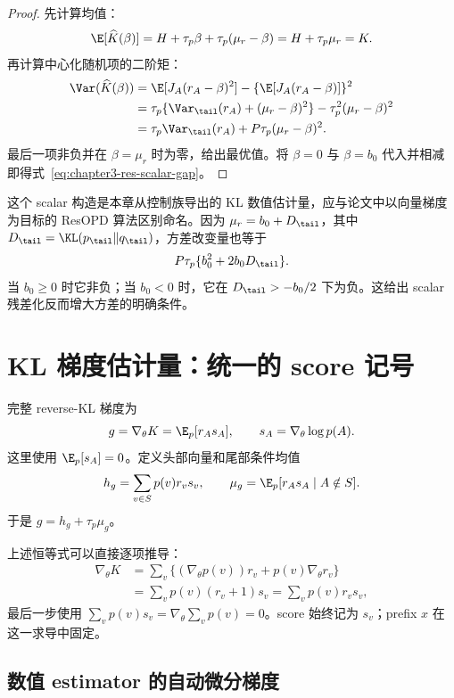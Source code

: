 \begin{proof}
先计算均值：
\[
 \E[\widehat K(\beta)]=H+\tau_p\beta+\tau_p(\mu_r-\beta)=H+\tau_p\mu_r=K.
\]
再计算中心化随机项的二阶矩：
\begin{align*}
 \Var(\widehat K(\beta))
 &=\E[J_A(r_A-\beta)^2]-\{\E[J_A(r_A-\beta)]\}^2\\
 &=\tau_p\{\Var_{\tail}(r_A)+(\mu_r-\beta)^2\}
   -\tau_p^2(\mu_r-\beta)^2\\
 &=\tau_p\Var_{\tail}(r_A)+P\tau_p(\mu_r-\beta)^2.
\end{align*}
最后一项非负并在 $\beta=\mu_r$ 时为零，给出最优值。将 $\beta=0$ 与 $\beta=b_0$ 代入并相减即得式~\eqref{eq:chapter3-res-scalar-gap}。
\end{proof}

这个 scalar 构造是本章从控制族导出的 KL 数值估计量，应与论文中以向量梯度为目标的 ResOPD 算法区别命名。因为 $\mu_r=b_0+D_{\tail}$，其中 $D_{\tail}=\KL(p_\tail\Vert q_\tail)$，方差改变量也等于
\[
 P\tau_p\{b_0^2+2b_0D_{\tail}\}.
\]
当 $b_0\geq0$ 时它非负；当 $b_0<0$ 时，它在 $D_{\tail}>-b_0/2$ 下为负。这给出 scalar 残差化反而增大方差的明确条件。

\section{KL 梯度估计量：统一的 score 记号}

完整 reverse-KL 梯度为
\begin{equation}
 g=\nabla_\theta K=\E_p[r_A s_A],
 \qquad s_A=\nabla_\theta\log p(A).
 \label{eq:chapter3-gradient-target}
\end{equation}
这里使用 $\E_p[s_A]=0$。定义头部向量和尾部条件均值
\[
 h_g=\sum_{v\in S}p(v)r_vs_v,
 \qquad
 \mu_g=\E_p[r_As_A\mid A\notin S].
\]
于是 $g=h_g+\tau_p\mu_g$。

上述恒等式可以直接逐项推导：
\begin{align*}
 \nabla_\theta K
 &=\sum_v\{(\nabla_\theta p(v))r_v+p(v)\nabla_\theta r_v\}\\
 &=\sum_vp(v)(r_v+1)s_v
 =\sum_vp(v)r_vs_v,
\end{align*}
最后一步使用 $\sum_vp(v)s_v=\nabla_\theta\sum_vp(v)=0$。score 始终记为 $s_v$；prefix $x$ 在这一求导中固定。

\subsection{数值 estimator 的自动微分梯度}

